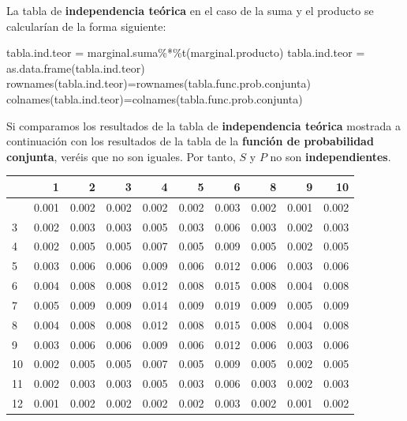 \documentclass[
  letterpaper,
  DIV=11,
  numbers=noendperiod]{scrreprt}
\newenvironment{Shaded}{\begin{snugshade}}{\end{snugshade}}
\newcommand{\FunctionTok}[1]{\textcolor[rgb]{0.28,0.35,0.67}{#1}}
\newcommand{\NormalTok}[1]{\textcolor[rgb]{0.00,0.23,0.31}{#1}}
\newcommand{\OtherTok}[1]{\textcolor[rgb]{0.00,0.23,0.31}{#1}}
\newcommand{\SpecialCharTok}[1]{\textcolor[rgb]{0.37,0.37,0.37}{#1}}
\begin{document}
La tabla de \textbf{independencia teórica } en el caso de la suma y el
producto se calcularían de la forma siguiente:

\begin{Shaded}
\begin{Highlighting}[]
\NormalTok{tabla.ind.teor }\OtherTok{=}\NormalTok{  marginal.suma}\SpecialCharTok{\%*\%}\FunctionTok{t}\NormalTok{(marginal.producto)}
\NormalTok{tabla.ind.teor }\OtherTok{=} \FunctionTok{as.data.frame}\NormalTok{(tabla.ind.teor)}
\FunctionTok{rownames}\NormalTok{(tabla.ind.teor)}\OtherTok{=}\FunctionTok{rownames}\NormalTok{(tabla.func.prob.conjunta)}
\FunctionTok{colnames}\NormalTok{(tabla.ind.teor)}\OtherTok{=}\FunctionTok{colnames}\NormalTok{(tabla.func.prob.conjunta)}
\end{Highlighting}
\end{Shaded}

Si comparamos los resultados de la tabla de \textbf{independencia
teórica} mostrada a continuación con los resultados de la tabla de la
\textbf{función de probabilidad conjunta}, veréis que no son iguales.
Por tanto, \(S\) y \(P\) no son \textbf{independientes}.

\begin{longtable}[]{@{}lrrrrrrrrr@{}}
\toprule\noalign{}
& 1 & 2 & 3 & 4 & 5 & 6 & 8 & 9 & 10 \\
\midrule\noalign{}
\endhead
\bottomrule\noalign{}
\endlastfoot
2 & 0.001 & 0.002 & 0.002 & 0.002 & 0.002 & 0.003 & 0.002 & 0.001 &
0.002 \\
3 & 0.002 & 0.003 & 0.003 & 0.005 & 0.003 & 0.006 & 0.003 & 0.002 &
0.003 \\
4 & 0.002 & 0.005 & 0.005 & 0.007 & 0.005 & 0.009 & 0.005 & 0.002 &
0.005 \\
5 & 0.003 & 0.006 & 0.006 & 0.009 & 0.006 & 0.012 & 0.006 & 0.003 &
0.006 \\
6 & 0.004 & 0.008 & 0.008 & 0.012 & 0.008 & 0.015 & 0.008 & 0.004 &
0.008 \\
7 & 0.005 & 0.009 & 0.009 & 0.014 & 0.009 & 0.019 & 0.009 & 0.005 &
0.009 \\
8 & 0.004 & 0.008 & 0.008 & 0.012 & 0.008 & 0.015 & 0.008 & 0.004 &
0.008 \\
9 & 0.003 & 0.006 & 0.006 & 0.009 & 0.006 & 0.012 & 0.006 & 0.003 &
0.006 \\
10 & 0.002 & 0.005 & 0.005 & 0.007 & 0.005 & 0.009 & 0.005 & 0.002 &
0.005 \\
11 & 0.002 & 0.003 & 0.003 & 0.005 & 0.003 & 0.006 & 0.003 & 0.002 &
0.003 \\
12 & 0.001 & 0.002 & 0.002 & 0.002 & 0.002 & 0.003 & 0.002 & 0.001 &
0.002 \\
\end{longtable}
\end{document}
